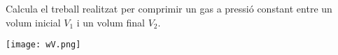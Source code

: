 \begin{exr}
    Calcula el treball realitzat per comprimir un gas a pressió constant entre un volum inicial $V_1$ i un volum final $V_2$.
    \begin{center}
    \texttt{[image: wV.png]}
    \end{center}
    \end{exr}
    \lct{}